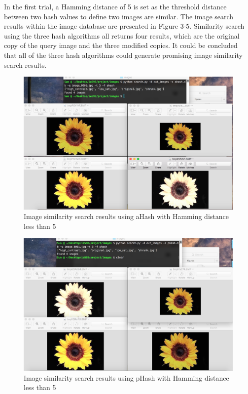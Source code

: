 \documentclass[letterpaper,12pt]{article}
\begin{document}
In the first trial, a Hamming distance of 5 is set as the threshold distance between two hash values to define two images are similar. The image search results within the image database are presented in Figure 3-5. Similarity search using the three hash algorithms all returns four results, which are the original copy of the query image and the three modified copies. It could be concluded that all of the three hash algorithms could generate promising image similarity search results.

\begin{figure}[h!]
	\centering
	\includegraphics[scale=0.3]{figures/figure_3}
	\caption{Image similarity search results using aHash with Hamming distance less than 5}
\end{figure}

\begin{figure}[h!]
	\centering
	\includegraphics[scale=0.3]{figures/figure_4}
	\caption{Image similarity search results using pHash with Hamming distance less than 5}
\end{figure}
\end{document}
